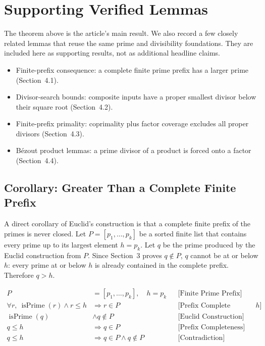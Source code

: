 \section{Supporting Verified Lemmas}
\label{sec:supporting-lemmas}

The theorem above is the article's main result. We also record a few
closely related lemmas that reuse the same prime and divisibility
foundations. They are included here as supporting results, not as
additional headline claims.

\begin{itemize}
  \item Finite-prefix consequence: a complete finite prime prefix has a
    larger prime (Section~4.1).
  \item Divisor-search bounds: composite inputs have a proper smallest
    divisor below their square root (Section~4.2).
  \item Finite-prefix primality: coprimality plus factor coverage excludes
    all proper divisors (Section~4.3).
  \item B\'ezout product lemmas: a prime divisor of a product is forced
    onto a factor (Section~4.4).
\end{itemize}

\subsection{Corollary: Greater Than a Complete Finite Prefix}
\label{sec:complete-finite-prefix}

A direct corollary of Euclid's construction is that a complete finite
prefix of the primes is never closed. Let $P=[p_1,\dots,p_k]$ be a sorted
finite list that contains every prime up to its largest element $h=p_k$.
Let $q$ be the prime produced by the Euclid construction from $P$. Since
Section~3 proves $q\notin P$, $q$ cannot be at or below $h$: every prime
at or below $h$ is already contained in the complete prefix. Therefore
$q > h$.

\begin{equation*}
\begin{aligned}
P &= [p_1,\dots,p_k],\quad h=p_k
&&\text{[Finite Prime Prefix]} \\
\forall r,\ \operatorname{isPrime}(r)\land r\le h
&\Rightarrow r\in P
&&\text{[Prefix Complete Through }h\text{]} \\
\operatorname{isPrime}(q)
&\land q\notin P
&&\text{[Euclid Construction]} \\
q\le h
&\Rightarrow q\in P
&&\text{[Prefix Completeness]} \\
q\le h
&\Rightarrow q\in P\land q\notin P
&&\text{[Contradiction]}
\end{aligned}
\end{equation*}

